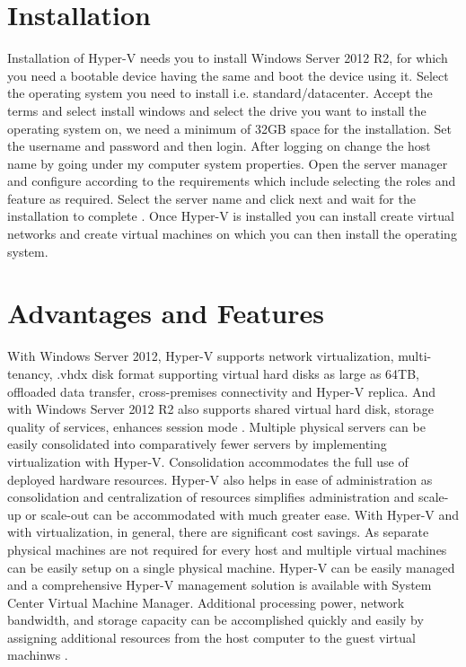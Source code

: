 \documentclass[9pt,twocolumn,twoside]{../../styles/osajnl}
\begin{document}
\section{Installation}

Installation of Hyper-V needs you to install Windows Server 2012 R2,
for which you need a bootable device having the same and boot the
device using it. Select the operating system you need to install
i.e. standard/datacenter.  Accept the terms and select install windows
and select the drive you want to install the operating system on, we
need a minimum of 32GB space for the installation. Set the username
and password and then login. After logging on change the host name by
going under my computer system properties. Open the server manager and
configure according to the requirements which include selecting the
roles and feature as required. Select the server name and click next
and wait for the installation to complete
\cite{www-hyperv-paper2}. Once Hyper-V is installed you can install
create virtual networks and create virtual machines on which you can
then install the operating system.

\section{Advantages and Features}

With Windows Server 2012, Hyper-V supports network virtualization,
multi-tenancy, .vhdx
disk format supporting virtual hard disks as
large as 64TB, offloaded data transfer, cross-premises connectivity
and Hyper-V replica. And with Windows Server 2012 R2 also supports
shared virtual hard disk, storage quality of services, enhances
session mode \cite{www-hyperv-wikipedia}. Multiple physical servers
can be easily consolidated into comparatively fewer servers by
implementing virtualization with Hyper-V. Consolidation accommodates
the full use of deployed hardware resources. Hyper-V also helps in
ease of administration as consolidation and centralization of
resources simplifies administration and scale-up or scale-out can be
accommodated with much greater ease. With Hyper-V and with
virtualization, in general, there are significant cost savings. As
separate physical machines are not required for every host and
multiple virtual machines can be easily setup on a single physical
machine. Hyper-V can be easily managed and a comprehensive Hyper-V
management solution is available with System Center Virtual Machine
Manager.  Additional processing power, network bandwidth, and storage
capacity can be accomplished quickly and easily by assigning
additional resources from the host computer to the guest virtual
machinws \cite{www-hyperv-advantages}.
\end{document}
